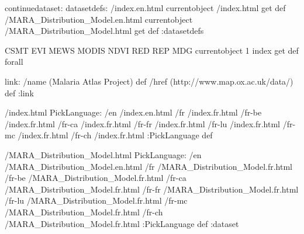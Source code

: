 \begin{ingrid}
continuedataset:
datasetdefs:
/index.en.html currentobject /index.html get def
/MARA_Distribution_Model.en.html currentobject /MARA_Distribution_Model.html get def
:datasetdefs

{ CSMT EVI MEWS MODIS NDVI RED REP MDG } { currentobject 1 index get def } forall

link:
/name (Malaria Atlas Project) def
/href (http://www.map.ox.ac.uk/data/) def
:link

/index.html {
PickLanguage:
/en /index.en.html
/fr /index.fr.html
/fr-be /index.fr.html
/fr-ca /index.fr.html
/fr-fr /index.fr.html
/fr-lu /index.fr.html
/fr-mc /index.fr.html
/fr-ch /index.fr.html
:PickLanguage
} def

/MARA_Distribution_Model.html {
PickLanguage:
/en /MARA_Distribution_Model.en.html
/fr /MARA_Distribution_Model.fr.html
/fr-be /MARA_Distribution_Model.fr.html
/fr-ca /MARA_Distribution_Model.fr.html
/fr-fr /MARA_Distribution_Model.fr.html
/fr-lu /MARA_Distribution_Model.fr.html
/fr-mc /MARA_Distribution_Model.fr.html
/fr-ch /MARA_Distribution_Model.fr.html
:PickLanguage
} def
:dataset
\end{ingrid}
